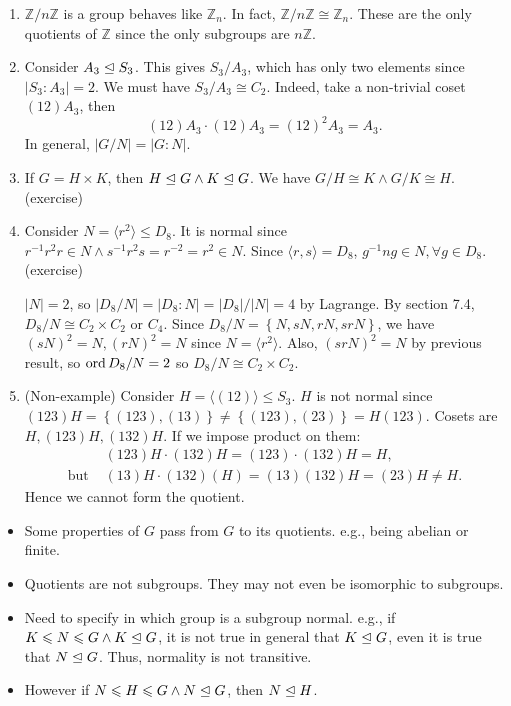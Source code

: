 \documentclass[a4paper]{article}
\newcommand{\bluecomment}[1]{{\color{blue}#1}}
\begin{document}
    \begin{example}
        \begin{enumerate}
            \item $ \mathbb{Z}/n\mathbb{Z} $ is a group behaves like $ \mathbb{Z}_{n} $. In fact, $ \mathbb{Z}/n\mathbb{Z} \cong \mathbb{Z}_{n} $. These are the only quotients of $ \mathbb{Z} $ since the only subgroups are $ n \mathbb{Z} $.
            \item Consider $ A_3 \trianglelefteq S_3 $. This gives $ S_3/A_3$, which has only two elements since $ |S_3:A_3|=2 $. We must have $ S_3/A_3 \cong C_2 $. Indeed, take a non-trivial coset $ (12) A_3$, then
            \[
                (12)A_3\cdot (12)A_3=(12)^2A_3=A_3
            .\]
            \bluecomment{In general, $ |G/N| =|G:N|$.}
            \item If $ G=H\times K $, then $ H \trianglelefteq G \land K\trianglelefteq G $. We have $ G/H \cong K \land G/K \cong H $.(exercise)
            \item Consider $ N=\langle r^2 \rangle \le D_8 $. It is normal since $ r^{-1}r^2r\in N \land s^{-1}r^2s=r^{-2}=r^2\in N $. Since $ \langle r,s \rangle =D_8 $, $ g^{-1}ng\in N, \forall g\in D_8 $.(exercise)

            $ |N|=2 $, so $ |D_8/N|=|D_8:N|=|D_8|/|N|=4 $ by Lagrange. By section 7.4, $ D_8/N\cong C_2\times C_2 \text{ or } C_4 $. Since $ D_8/N=\left\{ N,sN,rN,srN\right\} $, we have $ (sN)^2=N, (rN)^2=N $ since $ N=\langle r^2 \rangle $. Also, $ (srN)^2=N $ by previous result, so $ \operatorname{ord} D_8/N=2 $ so $ D_8/N\cong C_2 \times C_2 $.
            \item (Non-example) Consider $ H=\langle (12) \rangle \le S_3 $. $H$ is not normal since $ (123)H=\left\{ (123),(13)\right\}\neq \left\{ (123),(23)\right\}=H(123) $. Cosets are $ H, (123)H, (132)H $. If we impose product on them:
            \[
                \begin{aligned}
                    &(123)H\cdot (132)H=(123)\cdot (132)H=H,\\ 
                    \text{but } &(13)H\cdot (132)(H)=(13)(132)H=(23)H\neq H.
                \end{aligned}
            \]
            Hence we cannot form the quotient.
        \end{enumerate}
    \end{example}
    \begin{remark}
        \begin{itemize}
            \item Some properties of $G$ pass from $G$ to its quotients. e.g., being abelian or finite.
            \item Quotients are not subgroups. They may not even be isomorphic to subgroups.
            \item Need to specify in which group is a subgroup normal. e.g., if $ K\leqslant N\leqslant G \land K \trianglelefteq G $, it is not true in general that $ K \trianglelefteq G$, even it is true that $ N\trianglelefteq G $. Thus, normality is not transitive.
            \item However if $ N\leqslant H\leqslant G  \land N \trianglelefteq G$, then $ N\trianglelefteq H $.
        \end{itemize}
    \end{remark}
\end{document}
